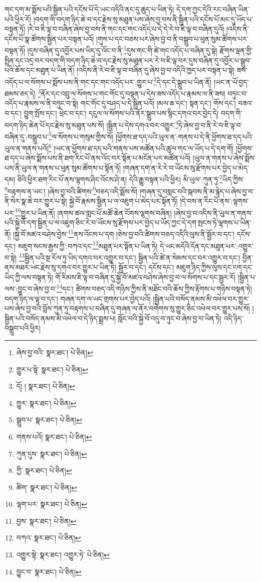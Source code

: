 གང་དག་མ་སྨོས་པའི་སྦྱིན་པའི་དངོས་པོ་དེ་ཡང་འདིའི་ནང་དུ་ཆུད་པ་ཡིན་ཏེ། དེ་དག་ཀྱང་དེའི་རང་བཞིན་ཡིན་པའི་ཕྱིར་རོ། །བདག་གི་བདག་ཉིད་ཆེ་བ་དང་རྗེས་སུ་མཐུན་པས་ཞེས་བྱ་བས་ནི་སྦྱིན་པའི་དངོས་པོ་མང་དུ་ཡོད་པ་བསྟན་ཏོ། །རེ་བ་ཇི་ལྟ་བ་བཞིན་ཞེས་བྱ་བས་ནི་གང་དང་གང་འདོད་པ་དེ་དེ་རེ་བ་ཇི་ལྟ་བ་བཞིན་དུའོ། །འདིས་ནི་དངོས་པོ་སྣ་ཚོགས་སྦྱིན་པར་བསྟན་པའོ། །གུས་པ་དང་བཅས་པར་ཞེས་བྱ་བ་ནི་བསྒྲུབ་པ་ཕུན་སུམ་ཚོགས་པར་བསྟན་ཏོ། །དུས་བཞིན་དུ་འབྱོར་པས་ཡིད་དུ་འོང་བ་ནི་\footnote{ཞེས་བྱ་བའི་  སྣར་ཐང་།  པེ་ཅིན། }དུས་གང་གི་ཚེ་གང་འདོད་པ་བཞིན་དུ་སྟེ། རྫོགས་ལྡན་གྱི་སྤྲིན་དང་འདྲ་བར་བདག་གི་བདག་ཉིད་ཆེ་བ་དང་རྗེས་སུ་མཐུན་པར་རེ་བ་ཇི་ལྟ་བར་དུས་བཞིན་དུ་འབྱོར་པ་སྒྲུབ་པའི་ཆོས་དང་མཐུན་པ་ཡིན་ནོ། །འདིས་ནི་རེ་བ་ཇི་ལྟ་བ་བཞིན་དུ་ཞེས་བྱ་བ་འདིའི་ཁྱད་པར་བསྟན་པ་སྟེ། ཟས་འདོད་པ་ལ་སོགས་པ་སྨོས་པས་ནི་གང་དང་གང་འདོད་པར་:གྱུར་པ་\footnote{གྱུར་པ་སྟེ་  སྣར་ཐང་།  པེ་ཅིན། }དེ་དང་དེ་སྒྲུབ་པ་ཡིན་ནོ། །ཡང་ན་ཡོ་བྱད་ཐམས་ཅད་དེ། \footnote{དོ། །   སྣར་ཐང་།  པེ་ཅིན། }ནོར་དང་འབྲུ་ལ་སོགས་པ་གང་གོང་དུ་བསྟན་པ་དེས་ཟས་འདོད་པ་རྣམས་ལ་ནི་ཟས། བཏུང་བ་འདོད་པ་རྣམས་ལ་ནི་བཏུང་བ་སྟེ། གང་གོང་དུ་བཤད་པ་དེ་སྦྱིན་པའོ། །མལ་ཆ་དང་། སྟན་དང་། གོས་དང་། བཟའ་བ་དང་། བྱུག་སྤོས་དང་། ཕྲེང་བ་དང་། དངུལ་ལ་སོགས་པའི་ནོར་སྒྲུབ་པས་སྙིང་དགའ་བར་བྱེད་དེ། བདག་གི་བདག་ཉིད་ཆེན་པོ་དང་རྗེས་སུ་མཐུན་པས་སོ། །སྦྱིན་པ་དེས་དགའ་བར་འགྱུར་\footnote{གྱུར་  སྣར་ཐང་།  པེ་ཅིན། }ཏེ་ཞེས་བྱ་བ་ནི་རེ་བ་ཇི་ལྟ་བ་བཞིན་དུ་:བསྒྲུབ་པ་\footnote{སྒྲུབ་པ་  སྣར་ཐང་།  པེ་ཅིན། }ལ་སོགས་པ་གསུམ་གྱིས་སོ། །ཕྱོགས་ཐ་དད་པའི་ཡུལ་ན་:གནས་པ་དེ་ནི་ཕྱོགས་ཐ་དད་པའི་ཡུལ་ན་གནས་པའོ།\footnote{གནས་པའོ།  སྣར་ཐང་།  པེ་ཅིན། } །ཡང་ན་ཕྱོགས་ཐ་དད་པའི་གནས་པས་མཚོན་པའི་ཚུལ་གང་ལ་ཡོད་པ་དེ་དག་གོ། །ཕྱོགས་ཐ་དད་པ་ཞེས་སྨོས་པས་ནི་ཐག་རིང་པོ་ནས་འོང་བར་སྟོན་པ་མངོན་པར་མཚོན་པའོ། །ཡུལ་ན་གནས་པ་ཞེས་སྨོས་པས་ནི་ཡུལ་ན་གནས་པ་ཕུན་སུམ་ཚོགས་པ་སྟོན་ཏོ། །གཞན་དག་ན་རེ་རེ་བ་ཡོངས་སུ་རྫོགས་པར་བྱེད་པ་མེད་དམ། ཅིའི་ཕྱིར་ཐག་རིང་པོ་ནས་ལྷགས་ཤིང་འོངས་ཤེ་ན། དེའི་རྒྱུ་བསྟན་པའི་ཕྱིར། མི་ཡུལ་:ཀུན་ཏུ་\footnote{ཀུན་དུས་  སྣར་ཐང་།  པེ་ཅིན། }ཡིད་ཀྱིས་\footnote{ཀྱི་  སྣར་ཐང་།  པེ་ཅིན། }བརྟགས་ན་ཡང་། །ཞེས་བྱ་བའི་ཚིགས་\footnote{ཚིག་  སྣར་ཐང་།  པེ་ཅིན། }བཅད་འདི་སྨོས་སོ། །གཞན་དུ་བསླང་བའི་སྐབས་ནི་མ་རྙེད་པ་ཞེས་བྱ་བ་ནི་སེར་སྣ་ཆེ་བར་གྱུར་པ་སྟེ། སྐྱེ་བོ་རྣམས་སྦྱིན་པ་ལ་འཇུག་པ་མེད་པར་སྟོན་ཏོ། །དེ་བས་ན་རིང་པོ་ནས་:ལྷགས་པར་\footnote{ལྷག་པར་  སྣར་ཐང་།  པེ་ཅིན། }གྱུར་པ་ཡིན་ནོ། །ནགས་ཚལ་གླང་པོ་མཚོ་ཆེན་ངོགས་ལྷགས་བཞིན། །ཞེས་བྱ་བ་འདིས་ནི་ཡུལ་ན་གནས་པའི་སྐྱེ་བོ་དག་སྦྱིན་པ་ལ་འཇུག་ཅིང་རེ་བ་ཡོངས་སུ་རྫོགས་པར་བྱེད་པ་ཡོད་ཀྱང་དེ་དག་སྤངས་ཏེ་ལྷགས་པ་ཡིན་ནོ། །སྐྱེ་བོ་མཛའ་བཤེས་བྱེས་\footnote{བྱས་  སྣར་ཐང་།  པེ་ཅིན། }ནས་འོངས་པ་དག །ཅེས་བྱ་བའི་ཚིགས་བཅད་འདིའི་ལུས་ནི་སྦྱོར་བ་དང་། དངོས་དང་། མཇུག་སངས་རྒྱས་ཀྱི་:བཀའ་དང་\footnote{བཀའ་  སྣར་ཐང་།  པེ་ཅིན། }མཐུན་པར་སྟོན་པ་ཡིན་ཏེ། དེ་ཡང་མདོའི་དོན་དང་མཐུན་པར་:འགྱུར་བ་སྟེ། \footnote{འགྱུར་སྟེ་  སྣར་ཐང་། འགྱུར་ཏེ་  པེ་ཅིན། }སྦྱིན་པའི་སྔ་རོལ་ཏུ་ཡིད་དགའ་བར་འགྱུར་བ་དང་། སྦྱིན་པའི་ཚེ་ན་སེམས་དང་བར་འགྱུར་བ་དང་། བྱིན་ནས་མཐར་ཡང་རྗེས་སུ་དགའ་བར་གྱུར་པ་ཡིན་ཏེ། སྦྱོར་བ་དང་། དངོས་དང་། མཇུག་ཉིད་ཀྱིས་ལུས་དང་ངག་དང་ཡིད་ཀྱི་ལས་བསྟན་ཏེ། གོ་རིམས་ཇི་ལྟ་བ་བཞིན་དུ་སྐྱེ་བོ་མཛའ་བཤེས་ཞེས་བྱ་བ་ལ་སོགས་པ་དང་སྦྱར་རོ། །སྦྱིན་པ་ལས་:བྱུང་བ་ཞེས་བྱ་བ་\footnote{བྱུང་བ་  སྣར་ཐང་།  པེ་ཅིན། }དང་། ཚིགས་བཅད་འདི་གཉིས་ཀྱིས་ནི་མཐོང་བའི་ཆོས་ཀྱིས་རྟོགས་པ་གཉིས་བསྟན་ཏེ། བདག་ཉིད་ལ་ལྟ་བ་དང་། གཞན་དག་ལ་ཡང་གྲགས་པར་བྱེད་པའོ། །སྦྱིན་པའི་བསོད་ནམས་མི་འཕེལ་བར་གྱུར་པས་ཞེས་བྱ་བའི་བློས་ཀུན་ཏུ་བརྟགས་པ་བཞིན་དུ་གཞན་ལ་ནོར་བགེགས་སུ་གྱུར་ཅིང་འཕེལ་བར་གྱུར་པས་སོ། །སྦྱིན་པའི་བསོད་ནམས་མི་འཕེལ་བ་དེ་ཉིད་སྨྲས་པ། སློང་བའི་སྐྱེ་བོ་འདུ་བ་ཉུང་བ་ཞེས་བྱ་བ་ཡིན་ཏེ། འདི་ཉིད་བསྒྲུབ་པའི་ཕྱིར། 
